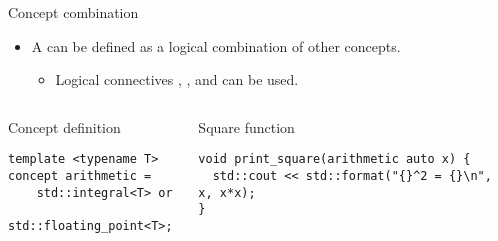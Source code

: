\begin{frame}[t,fragile]{Concept combination}
\begin{itemize}
  \item A  can be defined as a logical combination of other concepts.
    \begin{itemize}
      \item Logical connectives , , and  can be used.
    \end{itemize}
\end{itemize}

\begin{columns}[T]

\begin{block}{Concept definition}
\begin{lstlisting}
template <typename T>
concept arithmetic = 
    std::integral<T> or 
    std::floating_point<T>;
\end{lstlisting}
\end{block}

\pause
{}
\begin{block}{Square function}
\begin{lstlisting}
void print_square(arithmetic auto x) {
  std::cout << std::format("{}^2 = {}\n", x, x*x);
}
\end{lstlisting}
\end{block}

\end{columns}
\end{frame}

